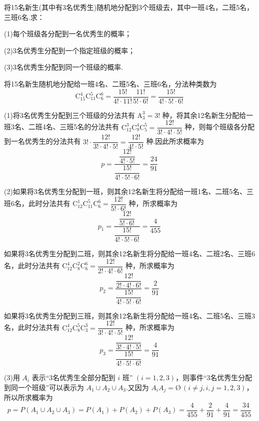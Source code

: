 \question 将15名新生(其中有3名优秀生)随机地分配到3个班级去，其中一班4名，二班5名，三班6名.求：

(1)每个班级各分配到一名优秀生的概率；

(2)3名优秀生分配到一个指定班级的概率；

(3)3名优秀生分配到同一个班级的概率.

\begin{solution}
    将15名新生随机地分配给一班4名、二班5名、三班6名，分法种类数为
    $$
    \mathrm{C}_{15}^4 \mathrm{C}_{11}^5 \mathrm{C}_6^6 = \dfrac{15!}{4! \cdot 11!} \dfrac{11!}{5! \cdot 6!} = \dfrac{15!}{4! \cdot 5! \cdot 6!}
    $$

    (1)将3名优秀生分配到三个班级的分法共有 $\mathrm{A}_3^3 = 3!$ 种，将其余12名新生分配给一班3名、二班4名、三班5名的分法共有 $\mathrm{C}_{12}^3 \mathrm{C}_9^4 \mathrm{C}_5^5 = \dfrac{12!}{3! \cdot 4! \cdot 5!}$ 种，则每个班级各分配到一名优秀生的分法共有 $3! \cdot \dfrac{12!}{3! \cdot 4! \cdot 5!} = \dfrac{12!}{4! \cdot 5!}$ 种.因此所求概率为
    $$
    p = \dfrac{\dfrac{12!}{4! \cdot 5!}}{\dfrac{15!}{4! \cdot 5! \cdot 6!}} = \dfrac{24}{91}
    $$

    (2)如果将3名优秀生分配到一班，则其余12名新生将分配给一班1名、二班5名、三班6名，此时分法共有 $\mathrm{C}_{12}^1 \mathrm{C}_{11}^5 \mathrm{C}_6^6 = \dfrac{12!}{5! \cdot 6!}$ 种，所求概率为
    $$
    p_1 = \dfrac{\dfrac{12!}{5! \cdot 6!}}{\dfrac{15!}{4! \cdot 5! \cdot 6!}} = \dfrac{4}{455}
    $$

    如果将3名优秀生分配到二班，则其余12名新生将分配给一班4名、二班2名、三班6名，此时分法共有 $\mathrm{C}_{12}^4 \mathrm{C}_{8}^2 \mathrm{C}_6^6 = \dfrac{12!}{2! \cdot 4! \cdot 6!}$ 种，所求概率为
    $$
    p_2 = \dfrac{\dfrac{12!}{2! \cdot 4! \cdot 6!}}{\dfrac{15!}{4! \cdot 5! \cdot 6!}} = \dfrac{2}{91}
    $$

    如果将3名优秀生分配到三班，则其余12名新生将分配给一班4名、二班5名、三班3名，此时分法共有 $\mathrm{C}_{12}^4 \mathrm{C}_{8}^5 \mathrm{C}_3^3 = \dfrac{12!}{3! \cdot 4! \cdot 5!}$ 种，所求概率为
    $$
    p_3 = \dfrac{\dfrac{12!}{3! \cdot 4! \cdot 5!}}{\dfrac{15!}{4! \cdot 5! \cdot 6!}} = \dfrac{4}{91}
    $$

    (3)用 $A_i$ 表示“3名优秀生全部分配到 $i$ 班” $(i=1,2,3)$，则事件“3名优秀生分配到同一个班级”可以表示为 $A_1 \cup A_2 \cup A_3$.又因为 $A_i A_j = \text{\O} \, (i \not= j, i,j=1,2,3)$，所以所求概率为
    $$
    p = P(A_1 \cup A_2 \cup A_3) = P(A_1) + P(A_2) + P(A_3) = \dfrac{4}{455} + \dfrac{2}{91} + \dfrac{4}{91} = \dfrac{34}{455}
    $$
\end{solution}